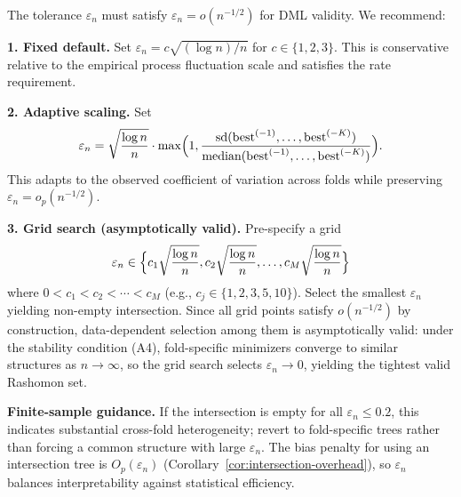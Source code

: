 \documentclass[12pt]{article}
\begin{document}
\begin{remark}
\label{rem:epsilon-choice}
The tolerance $\varepsilon_n$ must satisfy $\varepsilon_n = o(n^{-1/2})$ for DML validity. We recommend:

\textbf{1. Fixed default.} Set $\varepsilon_n = c\sqrt{(\log n)/n}$ for $c \in \{1,2,3\}$. This is conservative relative to the empirical process fluctuation scale and satisfies the rate requirement.

\textbf{2. Adaptive scaling.} Set
\[
\varepsilon_n = \sqrt{\frac{\log n}{n}} \cdot \max\Bigl(1, \frac{\text{sd}(\text{best}^{(-1)}, \ldots, \text{best}^{(-K)})}{\text{median}(\text{best}^{(-1)}, \ldots, \text{best}^{(-K)})}\Bigr).
\]
This adapts to the observed coefficient of variation across folds while preserving $\varepsilon_n = o_p(n^{-1/2})$.

\textbf{3. Grid search (asymptotically valid).} Pre-specify a grid
\[
\varepsilon_n \in \Bigl\{c_1\sqrt{\frac{\log n}{n}}, c_2\sqrt{\frac{\log n}{n}}, \ldots, c_M\sqrt{\frac{\log n}{n}}\Bigr\}
\]
where $0 < c_1 < c_2 < \cdots < c_M$ (e.g., $c_j \in \{1, 2, 3, 5, 10\}$). Select the smallest $\varepsilon_n$ yielding non-empty intersection. Since all grid points satisfy $o(n^{-1/2})$ by construction, data-dependent selection among them is asymptotically valid: under the stability condition (A4), fold-specific minimizers converge to similar structures as $n \to \infty$, so the grid search selects $\varepsilon_n \to 0$, yielding the tightest valid Rashomon set.

\textbf{Finite-sample guidance.} If the intersection is empty for all $\varepsilon_n \le 0.2$, this indicates substantial cross-fold heterogeneity; revert to fold-specific trees rather than forcing a common structure with large $\varepsilon_n$. The bias penalty for using an intersection tree is $O_p(\varepsilon_n)$ (Corollary~\ref{cor:intersection-overhead}), so $\varepsilon_n$ balances interpretability against statistical efficiency.
\end{remark}
\end{document}
